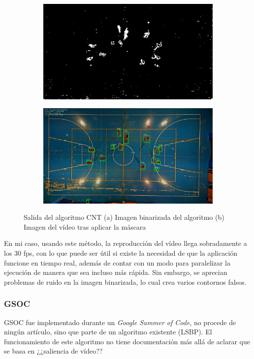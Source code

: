 \begin{figure}
\begin{subfigure}{.5\textwidth}
  \centering
  \includegraphics[width=.9\linewidth]{images/CNTsub}
  \caption { }
  \label{fig:CNT1a}
\end{subfigure}%
\begin{subfigure}{.5\textwidth}
  \centering
  \includegraphics[width=.9\linewidth]{images/CNT}
  \caption { }
  \label{fig:CNT1b}
\end{subfigure}
\caption{Salida del algoritmo CNT (a) Imagen binarizada del algoritmo (b) Imagen del vídeo tras aplicar la máscara }
\label{fig:CNT}
\end{figure}

En mi caso, usando este método, la reproducción del vídeo llega sobradamente a los 30 fps, con lo que puede ser útil si existe la necesidad de que la aplicación funcione en tiempo real, además de contar con un modo para paralelizar la ejecución de manera que sea incluso más rápida. Sin embargo, se aprecian problemas de ruido en la imagen binarizada, lo cual crea varios contornos falsos.

\subsubsection*{GSOC}
GSOC fue implementado durante un \textit{Google Summer of Code}, no procede de ningún artículo, sino que parte de un algoritmo existente (LSBP). El funcionamiento de este algoritmo no tiene documentación más allá de aclarar que se basa en ¿¿saliencia de vídeo??

